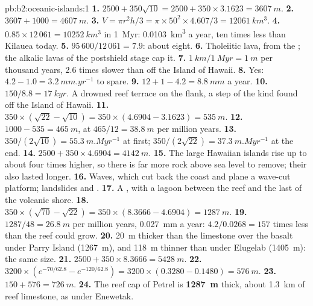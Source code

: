\begin{solution}{pb:b2:oceanic-islands:1}
\textbf{1.} $2500 + 350\sqrt{10} = 2500 + 350\times3.1623 = \qty{3607}{m}$.
\textbf{2.} $3607 + 1000 = \qty{4607}{m}$.
\textbf{3.} $V = \pi r^2h/3 = \pi\times50^2\times4.607/3 = \qty{12061}{km^3}$.
\textbf{4.} $0.85\times12\,061 = \qty{10252}{km^3}$ in \qty{1}{Myr}: \qty{0.0103}{km^3} a year,
ten times less than Kilauea today.
\textbf{5.} $95\,600/12\,061 = 7.9$: about eight.
\textbf{6.} Tholeiitic lava, from the ; the alkalic lavas of the postshield stage cap
it.
\textbf{7.} $\qty{1}{km}/\qty{1}{Myr} = \qty{1}{m}$ per thousand years, 2.6 times slower than off
the Island of Hawaii.
\textbf{8.} Yes: $4.2 - 1.0 = \qty{3.2}{mm.yr^{-1}}$ to spare.
\textbf{9.} $12 + 1 - 4.2 = \qty{8.8}{mm}$ a year.
\textbf{10.} $150/8.8 = \qty{17}{kyr}$. A drowned reef terrace on the flank, a step of the kind
found off the Island of Hawaii.
\textbf{11.} $350\times(\sqrt{22} - \sqrt{10}) = 350\times(4.6904 - 3.1623) = \qty{535}{m}$.
\textbf{12.} $1000 - 535 = \qty{465}{m}$, at $465/12 = \qty{38.8}{m}$ per million years.
\textbf{13.} $350/(2\sqrt{10}) = \qty{55.3}{m.Myr^{-1}}$ at first; $350/(2\sqrt{22}) =
\qty{37.3}{m.Myr^{-1}}$ at the end.
\textbf{14.} $2500 + 350\times4.6904 = \qty{4142}{m}$.
\textbf{15.} The large Hawaiian islands rise up to about four times higher, so there is far more
rock above sea level to remove; their  also lasted longer.
\textbf{16.} Waves, which cut back the coast and plane a wave-cut platform; landslides and .
\textbf{17.} A , with a lagoon between the reef and the last of the volcanic shore.
\textbf{18.} $350\times(\sqrt{70} - \sqrt{22}) = 350\times(8.3666 - 4.6904) = \qty{1287}{m}$.
\textbf{19.} $1287/48 = \qty{26.8}{m}$ per million years, \qty{0.027}{mm} a year: $4.2/0.0268 =
157$ times less than the reef could grow.
\textbf{20.} \qty{20}{m} thicker than the limestone over the basalt under Parry Island
(\qty{1267}{m}), and \qty{118}{m} thinner than under Elugelab (\qty{1405}{m}): the same size.
\textbf{21.} $2500 + 350\times8.3666 = \qty{5428}{m}$.
\textbf{22.} $3200\times(e^{-70/62.8} - e^{-120/62.8}) = 3200\times(0.3280 - 0.1480) =
\qty{576}{m}$.
\textbf{23.} $150 + 576 = \qty{726}{m}$.
\textbf{24.} The reef cap of Petrel  is \textbf{\qty{1287}{m}} thick, about \qty{1.3}{km}
of reef limestone, as under Enewetak.
\end{solution}
